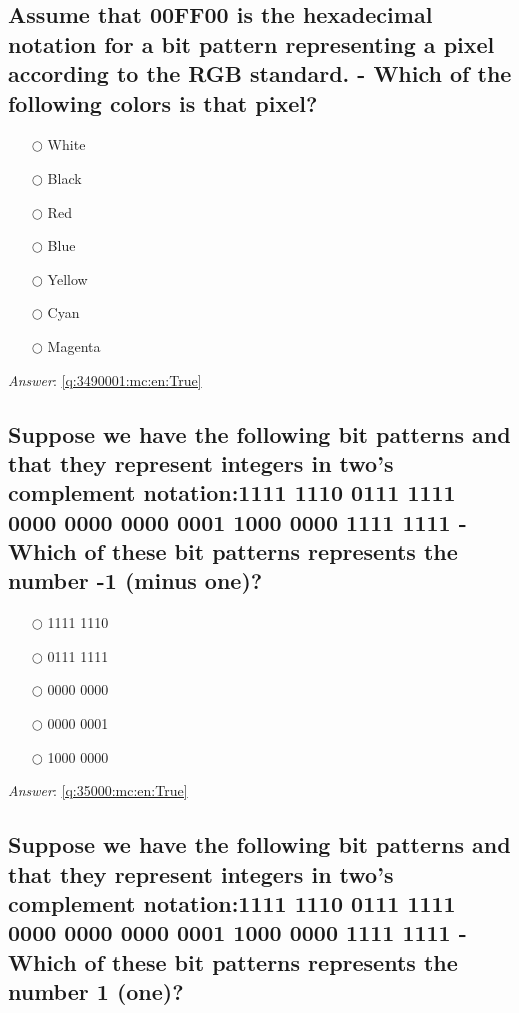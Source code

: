 \documentclass[a4paper,11pt,oneside]{article}
\begin{document}
\begin{sloppypar}
\subsection{Assume that 00FF00 is the hexadecimal notation for a bit pattern representing a pixel according to the RGB standard. - Which of the following colors is that pixel?}

\label{q:3490001:mc:en:False}

\begin{itemize}
  \item[$\bigcirc$] White
  \item[$\bigcirc$] Black
  \item[$\bigcirc$] Red
  \item[$\bigcirc$] Blue
  \item[$\bigcirc$] Yellow
  \item[$\bigcirc$] Cyan
  \item[$\bigcirc$] Magenta
\end{itemize}

\vspace{1cm}

\textit{Answer}: \autoref{q:3490001:mc:en:True}



\subsection{Suppose we have the following bit patterns and that they represent integers in two's complement notation:1111 1110 0111 1111 0000 0000 0000 0001 1000 0000 1111 1111 - Which of these bit patterns represents the number -1 (minus one)?}

\label{q:35000:mc:en:False}

\begin{itemize}
  \item[$\bigcirc$] 1111 1110
  \item[$\bigcirc$] 0111 1111
  \item[$\bigcirc$] 0000 0000
  \item[$\bigcirc$] 0000 0001
  \item[$\bigcirc$] 1000 0000
\end{itemize}

\vspace{1cm}

\textit{Answer}: \autoref{q:35000:mc:en:True}

\subsection{Suppose we have the following bit patterns and that they represent integers in two's complement notation:1111 1110 0111 1111 0000 0000 0000 0001 1000 0000 1111 1111 - Which of these bit patterns represents the number 1 (one)?}


\end{sloppypar}
\end{document}
